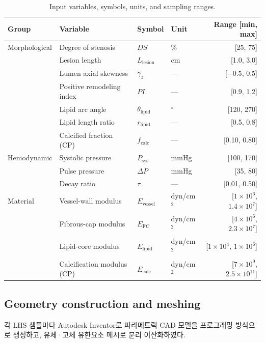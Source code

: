 \documentclass[master,english,final]{kaist-ucs}
\begin{document}
\begin{table}[ht]
\caption[Input variables]{Input variables, symbols, units, and sampling ranges.}
\label{tab:input-vars}
\begin{center}
\small
\begin{tabular}{llllr}
\hline\hline
Group & Variable & Symbol & Unit & Range [min, max] \\
\hline
Morphological & Degree of stenosis & $DS$ & \% & [25, 75] \\
& Lesion length & $L_\mathrm{lesion}$ & cm & [1.0, 3.0] \\
& Lumen axial skewness & $\gamma_z$ & --- & [$-0.5$, $0.5$] \\
& Positive remodeling index & $PI$ & --- & [0.9, 1.2] \\
& Lipid arc angle & $\theta_\mathrm{lipid}$ & $^\circ$ & [120, 270] \\
& Lipid length ratio & $r_\mathrm{lipid}$ & --- & [0.5, 0.8] \\
& Calcified fraction (CP) & $f_\mathrm{calc}$ & --- & [0.10, 0.80] \\
Hemodynamic & Systolic pressure & $P_\mathrm{sys}$ & mmHg & [100, 170] \\
& Pulse pressure & $\Delta P$ & mmHg & [35, 80] \\
& Decay ratio & $\tau$ & --- & [0.01, 0.50] \\
Material & Vessel-wall modulus & $E_\mathrm{vessel}$ & dyn/cm$^2$ & [$1\times10^6$, $1.4\times10^7$] \\
& Fibrous-cap modulus & $E_\mathrm{FC}$ & dyn/cm$^2$ & [$4\times10^6$, $2.3\times10^7$] \\
& Lipid-core modulus & $E_\mathrm{lipid}$ & dyn/cm$^2$ & [$1\times10^4$, $1\times10^6$] \\
& Calcification modulus (CP) & $E_\mathrm{calc}$ & dyn/cm$^2$ & [$7\times10^9$, $2.5\times10^{11}$] \\
\hline\hline
\end{tabular}
\end{center}
\end{table}

\subsection{Geometry construction and meshing}

각 LHS 샘플마다 Autodesk Inventor로 파라메트릭 CAD 모델을 프로그래밍 방식으로 생성하고, 유체·고체 유한요소 메시로 분리 이산화하였다.
\end{document}
